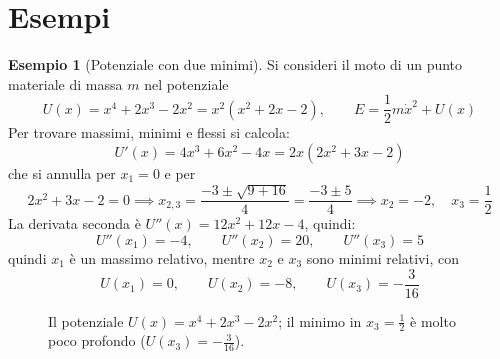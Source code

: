 \documentclass[11pt, a4paper, openright]{book}
\theoremstyle{plain}
\theoremstyle{definition}
\newtheorem{esempio}[teorema]{Esempio}
\theoremstyle{remark}
\begin{document}
\section{Esempi}

\begin{esempio}[Potenziale con due minimi]
    Si consideri il moto di un punto materiale di massa $m$ nel potenziale
    \begin{equation}
        U(x) = x^4 + 2x^3 - 2x^2 = x^2\left(x^2 + 2x - 2\right), \qquad E = \frac{1}{2}m\dot{x}^2 + U(x)
    \end{equation}
    Per trovare massimi, minimi e flessi si calcola:
    \begin{equation}
        U'(x) = 4x^3 + 6x^2 - 4x = 2x\left(2x^2 + 3x - 2\right)
    \end{equation}
    che si annulla per $x_1 = 0$ e per
    \begin{equation}
        2x^2 + 3x - 2 = 0 \implies x_{2,3} = \frac{-3 \pm \sqrt{9 + 16}}{4} = \frac{-3 \pm 5}{4} \implies x_2 = -2, \quad x_3 = \frac{1}{2}
    \end{equation}
    La derivata seconda è $U''(x) = 12x^2 + 12x - 4$, quindi:
    \begin{equation}
        U''(x_1) = -4, \qquad U''(x_2) = 20, \qquad U''(x_3) = 5
    \end{equation}
    quindi $x_1$ è un massimo relativo, mentre $x_2$ e $x_3$ sono minimi relativi, con
    \begin{equation}
        U(x_1) = 0, \qquad U(x_2) = -8, \qquad U(x_3) = -\frac{3}{16}
    \end{equation}

    \begin{figure}[H]
        \centering
        \caption{Il potenziale $U(x) = x^4 + 2x^3 - 2x^2$; il minimo in $x_3 = \frac{1}{2}$ è molto poco profondo ($U(x_3) = -\frac{3}{16}$).}
    \end{figure}


\end{esempio}
\end{document}
